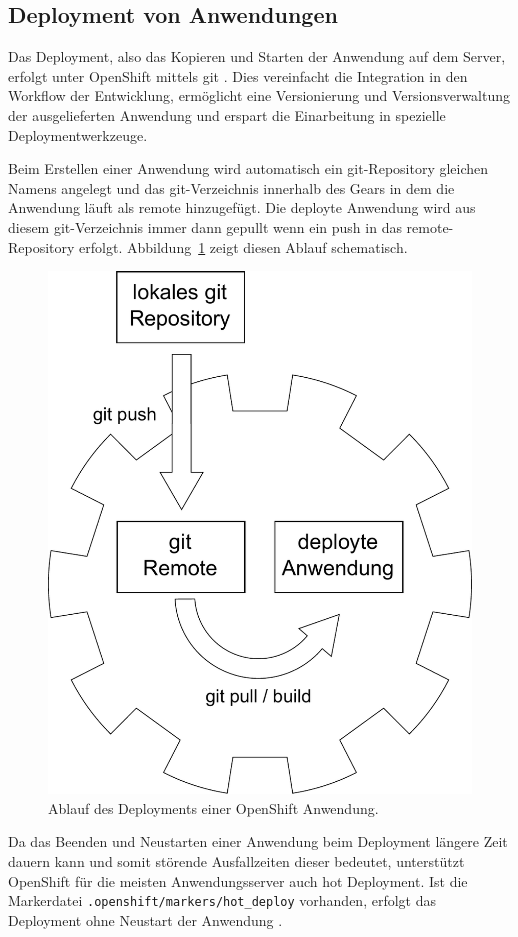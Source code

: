 \documentclass[10pt,a4paper,compsoc]{IEEEtran}
\begin{document}


\subsection{Deployment von Anwendungen}
Das Deployment, also das Kopieren und Starten der Anwendung auf dem Server, erfolgt unter OpenShift mittels git \cite{git}. Dies vereinfacht die Integration in den Workflow der Entwicklung, ermöglicht eine Versionierung und Versionsverwaltung der ausgelieferten Anwendung und erspart die Einarbeitung in spezielle Deploymentwerkzeuge.

Beim Erstellen einer Anwendung wird automatisch ein git-Repository gleichen Namens angelegt und das git-Verzeichnis innerhalb des Gears in dem die Anwendung läuft als remote hinzugefügt. Die deployte Anwendung wird aus diesem git-Verzeichnis immer dann gepullt wenn ein push in das remote-Repository erfolgt. Abbildung~\ref{fig:deployment} zeigt diesen Ablauf schematisch.

\begin{figure}[htbp]
\centering
\includegraphics[width=0.7\linewidth]{imgs/deployment}
\caption{Ablauf des Deployments einer OpenShift Anwendung.}
\label{fig:deployment}
\end{figure}

Da das Beenden und Neustarten einer Anwendung beim Deployment längere Zeit dauern kann und somit störende Ausfallzeiten dieser bedeutet, unterstützt OpenShift für die meisten An\-wen\-dungs\-ser\-ver auch hot Deployment. Ist die Markerdatei \verb!.openshift/markers/hot_deploy! vorhanden, erfolgt das Deployment ohne Neustart der Anwendung \cite[S.40f]{os_user_guide}.
\end{document}

